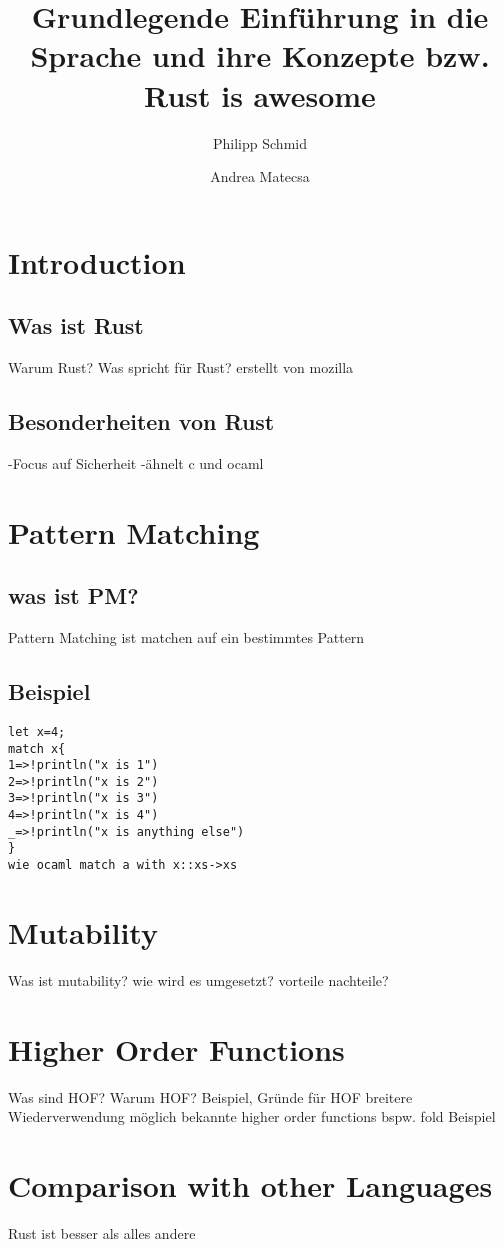 \documentclass[a4paper,10pt]{scrartcl}
\title{Grundlegende Einführung in die Sprache und ihre Konzepte bzw. Rust is awesome}
\author{Philipp Schmid \and Andrea Matecsa}
\begin{document}
\maketitle
\tableofcontents
\section{Introduction} 
\subsection{Was ist Rust}Warum Rust? Was spricht für Rust?
erstellt von mozilla
\subsection{Besonderheiten von Rust}
-Focus auf Sicherheit
-ähnelt c und ocaml
\section{Pattern Matching} 
\subsection{was ist PM?}
Pattern Matching ist matchen auf ein bestimmtes Pattern
\subsection{Beispiel}
\begin{lstlisting}
let x=4;
match x{
1=>!println("x is 1")
2=>!println("x is 2")
3=>!println("x is 3")
4=>!println("x is 4")
_=>!println("x is anything else")
}
wie ocaml match a with x::xs->xs
\end{lstlisting}
\section{Mutability} Was ist mutability? wie wird es umgesetzt? vorteile nachteile?

\section{Higher Order Functions} Was sind HOF? Warum HOF? Beispiel, Gründe für HOF
breitere Wiederverwendung möglich
bekannte higher order functions bspw. fold 
Beispiel

\section{Comparison with other Languages}
Rust ist besser als alles andere
\end{document}
